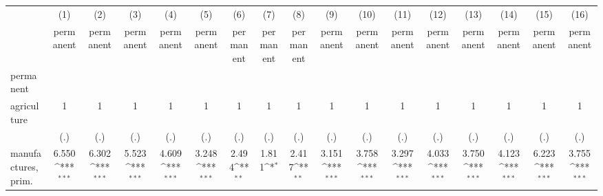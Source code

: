 {
\def\sym#1{\ifmmode^{#1}\else\(^{#1}\)\fi}
\begin{tabular}{l*{16}{c}}
\hline\hline
                    &\multicolumn{1}{c}{(1)}&\multicolumn{1}{c}{(2)}&\multicolumn{1}{c}{(3)}&\multicolumn{1}{c}{(4)}&\multicolumn{1}{c}{(5)}&\multicolumn{1}{c}{(6)}&\multicolumn{1}{c}{(7)}&\multicolumn{1}{c}{(8)}&\multicolumn{1}{c}{(9)}&\multicolumn{1}{c}{(10)}&\multicolumn{1}{c}{(11)}&\multicolumn{1}{c}{(12)}&\multicolumn{1}{c}{(13)}&\multicolumn{1}{c}{(14)}&\multicolumn{1}{c}{(15)}&\multicolumn{1}{c}{(16)}\\
                    &\multicolumn{1}{c}{permanent}&\multicolumn{1}{c}{permanent}&\multicolumn{1}{c}{permanent}&\multicolumn{1}{c}{permanent}&\multicolumn{1}{c}{permanent}&\multicolumn{1}{c}{permanent}&\multicolumn{1}{c}{permanent}&\multicolumn{1}{c}{permanent}&\multicolumn{1}{c}{permanent}&\multicolumn{1}{c}{permanent}&\multicolumn{1}{c}{permanent}&\multicolumn{1}{c}{permanent}&\multicolumn{1}{c}{permanent}&\multicolumn{1}{c}{permanent}&\multicolumn{1}{c}{permanent}&\multicolumn{1}{c}{permanent}\\
\hline
permanent           &                     &                     &                     &                     &                     &                     &                     &                     &                     &                     &                     &                     &                     &                     &                     &                     \\
agriculture         &           1         &           1         &           1         &           1         &           1         &           1         &           1         &           1         &           1         &           1         &           1         &           1         &           1         &           1         &           1         &           1         \\
                    &         (.)         &         (.)         &         (.)         &         (.)         &         (.)         &         (.)         &         (.)         &         (.)         &         (.)         &         (.)         &         (.)         &         (.)         &         (.)         &         (.)         &         (.)         &         (.)         \\
[1em]
manufactures, prim. &       6.550\sym{***}&       6.302\sym{***}&       5.523\sym{***}&       4.609\sym{***}&       3.248\sym{***}&       2.494\sym{**} &       1.811\sym{*}  &       2.417\sym{**} &       3.151\sym{***}&       3.758\sym{***}&       3.297\sym{***}&       4.033\sym{***}&       3.750\sym{***}&       4.123\sym{***}&       6.223\sym{***}&       3.755\sym{***}\\

\end{tabular}}
